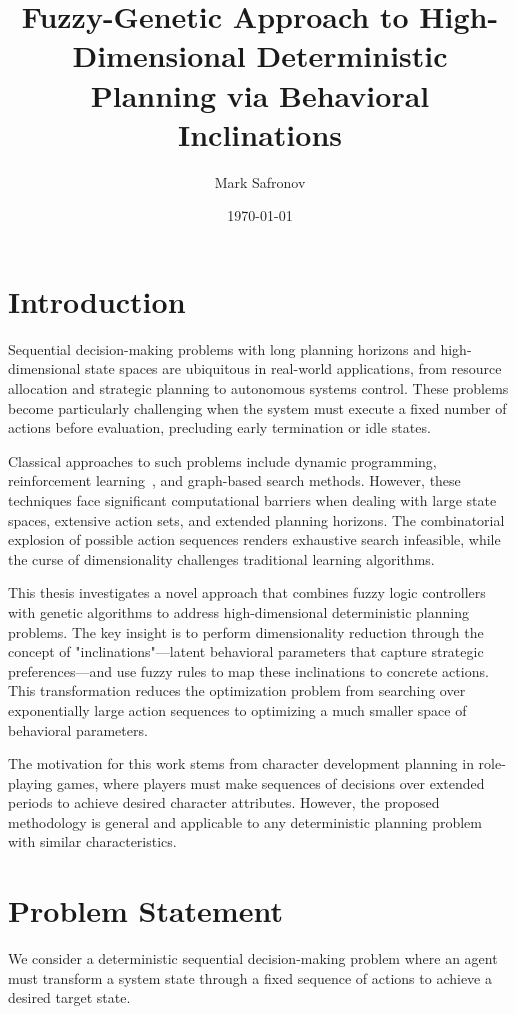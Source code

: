 \documentclass[11pt, a4paper]{article}
\title{Fuzzy-Genetic Approach to High-Dimensional Deterministic Planning via Behavioral Inclinations}
\author{Mark Safronov}
\date{\today}
\begin{document}
	
	
	
	\tableofcontents
	
\section{Introduction}

Sequential decision-making problems with long planning horizons and high-dimensional state spaces are ubiquitous in real-world applications, from resource allocation and strategic planning to autonomous systems control. These problems become particularly challenging when the system must execute a fixed number of actions before evaluation, precluding early termination or idle states.

Classical approaches to such problems include dynamic programming, reinforcement learning~\cite{sutton2018reinforcement}, and graph-based search methods. However, these techniques face significant computational barriers when dealing with large state spaces, extensive action sets, and extended planning horizons. The combinatorial explosion of possible action sequences renders exhaustive search infeasible, while the curse of dimensionality challenges traditional learning algorithms.

This thesis investigates a novel approach that combines fuzzy logic controllers with genetic algorithms to address high-dimensional deterministic planning problems. The key insight is to perform dimensionality reduction through the concept of "inclinations"—latent behavioral parameters that capture strategic preferences—and use fuzzy rules to map these inclinations to concrete actions. This transformation reduces the optimization problem from searching over exponentially large action sequences to optimizing a much smaller space of behavioral parameters.

The motivation for this work stems from character development planning in role-playing games, where players must make sequences of decisions over extended periods to achieve desired character attributes. However, the proposed methodology is general and applicable to any deterministic planning problem with similar characteristics.

\section{Problem Statement}

We consider a deterministic sequential decision-making problem where an agent must transform a system state through a fixed sequence of actions to achieve a desired target state.
\end{document}
